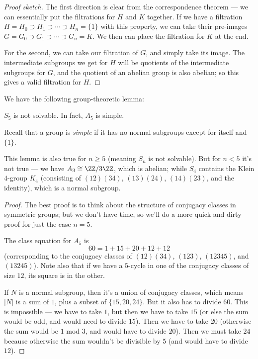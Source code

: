 \begin{proof}[Proof sketch]
    The first direction is clear from the correspondence theorem --- we can essentially put the filtrations for $H$ and $K$ together. If we have a filtration $H = H_0 \supset H_1 \supset \cdots \supset H_n = \{1\}$ with this property, we can take their pre-images $G = G_0 \supset G_1 \supset \cdots \supset G_n = K$. We then can place the filtration for $K$ at the end. 
    
    For the second, we can take our filtration of $G$, and simply take its image. The intermediate subgroups we get for $H$ will be quotients of the intermediate subgroups for $G$, and the quotient of an abelian group is also abelian; so this gives a valid filtration for $H$. 
\end{proof}

We have the following group-theoretic lemma:

\begin{lemma}
    $S_5$ is not solvable. In fact, $A_5$ is simple.
\end{lemma}

Recall that a group is \emph{simple} if it has no normal subgroups except for itself and $\{1\}$. 

This lemma is also true for $n \geq 5$ (meaning $S_n$ is not solvable). But for $n < 5$ it's not true --- we have $A_3 \cong \ZZ/3\ZZ$, which is abelian; while $S_4$ contains the Klein $4$-group $K_4$ (consisting of $(12)(34)$, $(13)(24)$, $(14)(23)$, and the identity), which is a normal subgroup. 

\begin{proof}
    The best proof is to think about the structure of conjugacy classes in symmetric groups; but we don't have time, so we'll do a more quick and dirty proof for just the case $n = 5$. 
    
    The class equation for $A_5$ is \[60 = 1 + 15 + 20 + 12 + 12\] (corresponding to the conjugacy classes of $(12)(34)$, $(123)$, $(12345)$, and $(13245)$). Note also that if we have a $5$-cycle in one of the conjugacy classes of size $12$, its square is in the other. 

    If $N$ is a normal subgroup, then it's a union of conjugacy classes, which means $\lvert N \rvert$ is a sum of $1$, plus a subset of $\{15, 20, 24\}$. But it also has to divide $60$. This is impossible --- we have to take $1$, but then we have to take $15$ (or else the sum would be odd, and would need to divide $15$). Then we have to take $20$ (otherwise the sum would be $1$ mod $3$, and would have to divide $20$). Then we must take $24$ because otherwise the sum wouldn't be divisible by $5$ (and would have to divide $12$). 
\end{proof}

